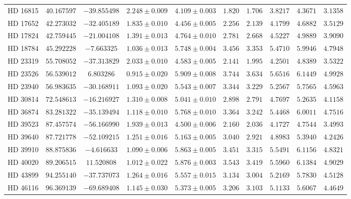 \documentclass[linenumbers,trackchanges,margins]{aastex701}
\begin{document}
\begin{table}[htbp]
\begin{tabular}{lccccccccc}
HD 16815 & $40.167597$ & $-39.855498$ & $2.248 \pm 0.009$ & $4.109 \pm 0.003$ & $1.820$ & $1.706$ & $3.8217$ & $4.3671$ & $3.1358$ \\
HD 17652 & $42.273032$ & $-32.405189$ & $1.835 \pm 0.010$ & $4.456 \pm 0.005$ & $2.256$ & $2.139$ & $4.1799$ & $4.6882$ & $3.5129$ \\
HD 17824 & $42.759445$ & $-21.004108$ & $1.391 \pm 0.013$ & $4.764 \pm 0.010$ & $2.781$ & $2.668$ & $4.5227$ & $4.9889$ & $3.9090$ \\
HD 18784 & $45.292228$ & $-7.663325$ & $1.036 \pm 0.013$ & $5.748 \pm 0.004$ & $3.456$ & $3.353$ & $5.4710$ & $5.9946$ & $4.7948$ \\
HD 23319 & $55.708052$ & $-37.313829$ & $2.033 \pm 0.010$ & $4.583 \pm 0.005$ & $2.141$ & $1.995$ & $4.2501$ & $4.8389$ & $3.5322$ \\
HD 23526 & $56.539012$ & $6.803286$ & $0.915 \pm 0.020$ & $5.909 \pm 0.008$ & $3.744$ & $3.634$ & $5.6516$ & $6.1449$ & $4.9928$ \\
HD 23940 & $56.983635$ & $-30.168911$ & $1.093 \pm 0.020$ & $5.543 \pm 0.007$ & $3.344$ & $3.229$ & $5.2567$ & $5.7565$ & $4.5963$ \\
HD 30814 & $72.548613$ & $-16.216927$ & $1.310 \pm 0.008$ & $5.041 \pm 0.010$ & $2.898$ & $2.791$ & $4.7697$ & $5.2635$ & $4.1158$ \\
HD 36874 & $83.281322$ & $-35.139494$ & $1.118 \pm 0.010$ & $5.768 \pm 0.010$ & $3.364$ & $3.242$ & $5.4468$ & $6.0011$ & $4.7516$ \\
HD 39523 & $87.457574$ & $-56.166990$ & $1.939 \pm 0.013$ & $4.500 \pm 0.006$ & $2.160$ & $2.036$ & $4.1727$ & $4.7544$ & $3.4993$ \\
HD 39640 & $87.721778$ & $-52.109215$ & $1.251 \pm 0.016$ & $5.163 \pm 0.005$ & $3.040$ & $2.921$ & $4.8983$ & $5.3940$ & $4.2426$ \\
HD 39910 & $88.875836$ & $-4.616633$ & $1.090 \pm 0.006$ & $5.863 \pm 0.005$ & $3.451$ & $3.315$ & $5.5491$ & $6.1156$ & $4.8321$ \\
HD 40020 & $89.206515$ & $11.520808$ & $1.012 \pm 0.022$ & $5.876 \pm 0.003$ & $3.543$ & $3.419$ & $5.5960$ & $6.1384$ & $4.9029$ \\
HD 43899 & $94.255140$ & $-37.737073$ & $1.264 \pm 0.016$ & $5.557 \pm 0.015$ & $3.134$ & $3.004$ & $5.2169$ & $5.7830$ & $4.5128$ \\
HD 46116 & $96.369139$ & $-69.689408$ & $1.145 \pm 0.030$ & $5.373 \pm 0.005$ & $3.206$ & $3.103$ & $5.1133$ & $5.6067$ & $4.4649$ \\

\end{tabular}
\end{table}
\end{document}
